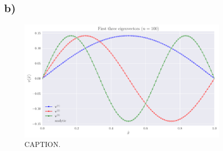 \documentclass[english,notitlepage,nofootinbib]{revtex4-1}  %
\begin{document}
\subsection*{b)}
\begin{figure}[h!]
    \centering
    \includegraphics[width=0.9\textwidth]{solution_100steps.pdf}
    \caption{CAPTION.}\label{fig:p6_solution100steps}
\end{figure}

   
\end{document}
